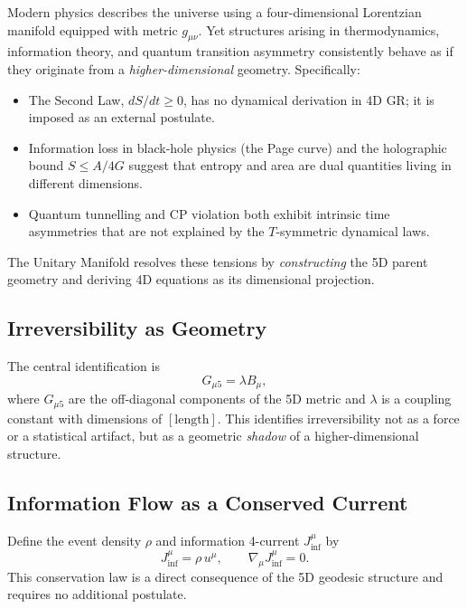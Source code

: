 \documentclass[12pt,a4paper]{article}
\newcommand{\gm}{g_{\mu\nu}}       %
\newcommand{\Jinf}{J_{\inf}^{\mu}} %
\newcommand{\lam}{\lambda}         %
\begin{document}
Modern physics describes the universe using a four-dimensional Lorentzian
manifold equipped with metric $\gm$.  Yet structures arising in thermodynamics,
information theory, and quantum transition asymmetry consistently behave as if
they originate from a \emph{higher-dimensional} geometry.  Specifically:
\begin{itemize}
  \item The Second Law, $dS/dt\ge 0$, has no dynamical derivation in 4D GR; it
        is imposed as an external postulate.
  \item Information loss in black-hole physics (the Page curve) and the
        holographic bound $S\le A/4G$ suggest that entropy and area are
        dual quantities living in different dimensions.
  \item Quantum tunnelling and CP violation both exhibit intrinsic time
        asymmetries that are not explained by the $T$-symmetric dynamical laws.
\end{itemize}

The Unitary Manifold resolves these tensions by \emph{constructing} the 5D
parent geometry and deriving 4D equations as its dimensional projection.

\subsection{Irreversibility as Geometry}
\label{subsec:irreversibility-geometry}

The central identification is
\begin{equation}
  G_{\mu 5} = \lam B_\mu ,
  \label{eq:ident}
\end{equation}
where $G_{\mu 5}$ are the off-diagonal components of the 5D metric and
$\lam$ is a coupling constant with dimensions of $[\text{length}]$.  This
identifies irreversibility not as a force or a statistical artifact, but as a
geometric \emph{shadow} of a higher-dimensional structure.

\subsection{Information Flow as a Conserved Current}

Define the event density $\rho$ and information 4-current $\Jinf$ by
\begin{equation}
  \Jinf = \rho\, u^{\mu}, \qquad \nabla_\mu \Jinf = 0 .
  \label{eq:info-conservation}
\end{equation}
This conservation law is a direct consequence of the 5D geodesic structure and
requires no additional postulate.
\end{document}
